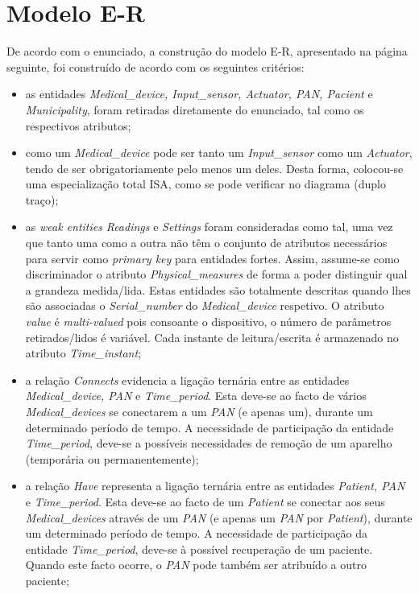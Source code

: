 \documentclass[a4paper]{article}
\begin{document}


\section{Modelo E-R}
De acordo com o enunciado, a construção do modelo E-R, apresentado na página seguinte, foi construído de acordo com os seguintes critérios:
\begin{itemize}

	\item as entidades \textit{Medical\_device, Input\_sensor, Actuator, 
	PAN, Pacient} e \textit{Municipality}, foram retiradas diretamente do enunciado, tal como os respectivos atributos;
	
	\item como um \textit{Medical\_device} pode ser tanto um \textit{Input\_sensor} 
	como um \textit{Actuator}, tendo de ser obrigatoriamente pelo menos um deles.
	Desta forma, colocou-se uma especialização total ISA, como se pode verificar no diagrama (duplo traço);

	\item as \textit{weak entities} \textit{Readings} e \textit{Settings} foram consideradas como tal, uma vez que tanto uma como a outra não têm o
	conjunto de atributos necessários para servir como \textit{primary key} para entidades fortes. Assim, assume-se como discriminador 
	o atributo \textit{Physical\_measures} de forma a poder distinguir qual a grandeza medida/lida. Estas entidades são totalmente
	descritas quando lhes são associadas o \textit{Serial\_number} do \textit{Medical\_device} respetivo. O atributo \textit{value} é
	\textit{multi-valued} pois consoante o dispositivo, o número de parâmetros retirados/lidos é variável. Cada instante de 
	leitura/escrita é 
	armazenado no atributo \textit{Time\_instant};
	
	\item a relação \textit{Connects} evidencia a ligação ternária entre as entidades \textit{Medical\_device, PAN} e 
	\textit{Time\_period}. Esta deve-se ao facto de vários \textit{Medical\_devices} se conectarem a um \textit{PAN} (e apenas um),
	 durante um determinado período de tempo. A necessidade de participação da entidade \textit{Time\_period}, deve-se a possíveis
	 necessidades de remoção de um aparelho (temporária ou permanentemente);
	 
	\item a relação \textit{Have} representa a ligação ternária entre as entidades \textit{Patient, PAN} e 
	\textit{Time\_period}. Esta deve-se ao facto de um \textit{Patient} se conectar aos seus \textit{Medical\_devices}
	através de um \textit{PAN} (e apenas um \textit{PAN} por \textit{Patient}),
	 durante um determinado período de tempo. A necessidade de participação da entidade \textit{Time\_period}, deve-se à possível recuperação de
	 um paciente. Quando este facto ocorre, o \textit{PAN} pode também ser atribuído a outro paciente;
	 

\end{itemize}
\end{document}
